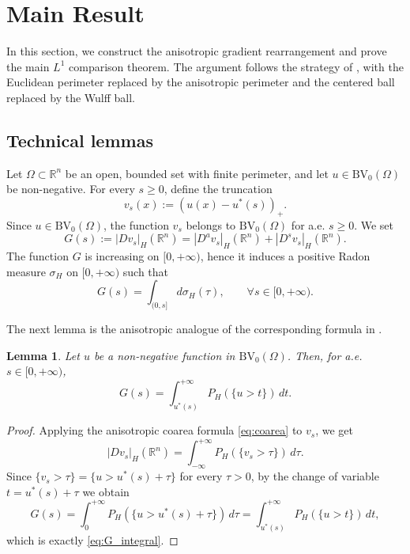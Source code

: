 \documentclass[oneside,a4paper,12pt,notitlepage]{article}
\newtheorem{lemma}[theorem]{Lemma}
\theoremstyle{definition}
\newcommand{\R}{\mathbb{R}}
\newcommand{\BV}{\text{BV}}
\begin{document}
\section{Main Result}
\label{sec:main_result}

In this section, we construct the anisotropic gradient rearrangement and prove the
main $L^1$ comparison theorem. The argument follows the strategy of
\cite{AGNT24}, with the Euclidean perimeter replaced by the anisotropic perimeter
and the centered ball replaced by the Wulff ball.

\subsection{Technical lemmas}
\label{subsec:lemmas}

Let $\Omega\subset \R^n$ be an open, bounded set with finite perimeter, and let
$u\in \BV_0(\Omega)$ be non-negative. For every $s\ge 0$, define the truncation
\begin{equation}\label{eq:truncation_def}
    v_s(x):=(u(x)-u^*(s))_+ .
\end{equation}
Since $u\in \BV_0(\Omega)$, the function $v_s$ belongs to $\BV_0(\Omega)$ for
a.e. $s\ge 0$. We set
\begin{equation}\label{eq:G_def}
    G(s):=|Dv_s|_H(\R^n)=|D^a v_s|_H(\R^n)+|D^s v_s|_H(\R^n).
\end{equation}
The function $G$ is increasing on $[0,+\infty)$, hence it induces a positive Radon
measure $\sigma_H$ on $[0,+\infty)$ such that
\begin{equation}\label{def:sigma}
    G(s)=\int_{(0,s]} d\sigma_H(\tau),
    \qquad \forall s\in[0,+\infty).
\end{equation}

The next lemma is the anisotropic analogue of the corresponding formula in
\cite{AGNT24}.

\begin{lemma}\label{lem:G_derivative}
Let $u$ be a non-negative function in $\BV_0(\Omega)$. Then, for a.e. $s\in[0,+\infty)$,
\begin{equation}\label{eq:G_integral}
    G(s)=\int_{u^*(s)}^{+\infty} P_H(\{u>t\})\,dt.
\end{equation}
\end{lemma}

\begin{proof}
Applying the anisotropic coarea formula \eqref{eq:coarea} to $v_s$, we get
\[
|Dv_s|_H(\R^n)=\int_{-\infty}^{+\infty} P_H(\{v_s>\tau\})\,d\tau .
\]
Since $\{v_s>\tau\}=\{u>u^*(s)+\tau\}$ for every $\tau>0$, by the change of
variable $t=u^*(s)+\tau$ we obtain
\[
G(s)=\int_0^{+\infty} P_H(\{u>u^*(s)+\tau\})\,d\tau
=\int_{u^*(s)}^{+\infty} P_H(\{u>t\})\,dt,
\]
which is exactly \eqref{eq:G_integral}.
\end{proof}
\end{document}
